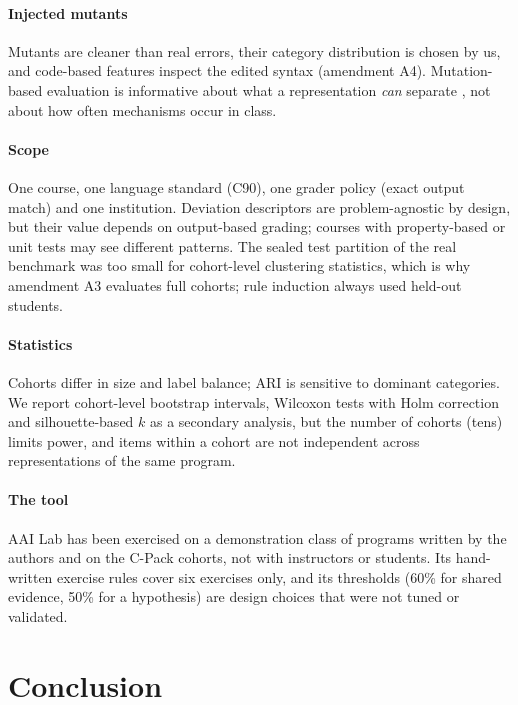\documentclass[a4paper,preprint,12pt,authoryear]{elsarticle}
\begin{document}
\paragraph{Injected mutants} Mutants are cleaner than real errors, their category distribution is chosen by us, and code-based features inspect the edited syntax (amendment A4). Mutation-based evaluation is informative about what a representation \emph{can} separate \citep{just2014mutants}, not about how often mechanisms occur in class.

\paragraph{Scope} One course, one language standard (C90), one grader policy (exact output match) and one institution. Deviation descriptors are problem-agnostic by design, but their value depends on output-based grading; courses with property-based or unit tests may see different patterns. The sealed test partition of the real benchmark was too small for cohort-level clustering statistics, which is why amendment A3 evaluates full cohorts; rule induction always used held-out students.

\paragraph{Statistics} Cohorts differ in size and label balance; ARI is sensitive to dominant categories. We report cohort-level bootstrap intervals, Wilcoxon tests with Holm correction and silhouette-based $k$ as a secondary analysis, but the number of cohorts (tens) limits power, and items within a cohort are not independent across representations of the same program.

\paragraph{The tool} AAI Lab has been exercised on a demonstration class of programs written by the authors and on the C-Pack cohorts, not with instructors or students. Its hand-written exercise rules cover six exercises only, and its thresholds (60\% for shared evidence, 50\% for a hypothesis) are design choices that were not tuned or validated.


\section{Conclusion}\label{sec:conclusion}
\end{document}
